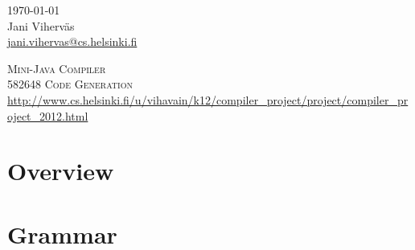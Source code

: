 \documentclass[a4paper,12pt]{article}
\author{Jani Viherväs}
\begin{document}
\thispagestyle{empty} 
\begin{flushright}
\today \\
\vspace{1em}
Jani Viherväs\\ 
\href{mailto:jani.vihervas@cs.helsinki.fi}{jani.vihervas@cs.helsinki.fi}
\end{flushright}

\vfill

\begin{center}
\textsc{\LARGE Mini-Java Compiler} \\
\vspace{1em}
\textsc{\large 582648 Code Generation}\\
\vspace{1em}
\url{http://www.cs.helsinki.fi/u/vihavain/k12/compiler_project/project/compiler_project_2012.html}
\end{center}

\vfill

\setcounter{page}{1}

\section{Overview}

\section{Grammar}
\end{document}
